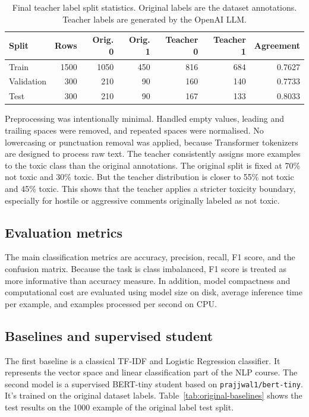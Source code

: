 \documentclass[pdflatex,sn-mathphys-num]{sn-jnl}
\begin{document}
\begin{table}[h]
\caption{Final teacher label split statistics.
Original labels are the dataset annotations.
Teacher labels are generated by the OpenAI LLM.}\label{tab:teacher-splits}
\centering
\begin{tabular}{lrrrrrr}
\toprule
Split & Rows & Orig. 0 & Orig. 1 & Teacher 0 & Teacher 1 & Agreement \\
\midrule
Train & 1500 & 1050 & 450 & 816 & 684 & 0.7627 \\
Validation & 300 & 210 & 90 & 160 & 140 & 0.7733 \\
Test & 300 & 210 & 90 & 167 & 133 & 0.8033 \\
\bottomrule
\end{tabular}
\end{table}

Preprocessing was intentionally minimal.
Handled empty values, leading and trailing spaces were removed, and repeated spaces were normalised. 
No lowercasing or punctuation removal was applied, because Transformer tokenizers are designed to process raw text.
The teacher consistently assigns more examples to the toxic class than the original annotations. 
The original split is fixed at 70\% not toxic and 30\% toxic.
But the teacher distribution is closer to 55\% not toxic and 45\% toxic. 
This shows that the teacher applies a stricter toxicity boundary, especially for hostile or aggressive comments originally labeled as not toxic.

\subsection{Evaluation metrics}

The main classification metrics are accuracy, precision, recall, F1 score, and the confusion matrix. 
Because the task is class imbalanced, F1 score is treated as more informative than accuracy measure.
In addition, model compactness and computational cost are evaluated using model size on disk, average inference time per example, and examples processed per second on CPU.

\subsection{Baselines and supervised student}

The first baseline is a classical TF-IDF and Logistic Regression classifier.
It represents the vector space and linear classification part of the NLP course.
The second model is a supervised BERT-tiny student based on \texttt{prajjwal1/bert-tiny}.
It's trained on the original dataset labels.
Table~\ref{tab:original-baselines} shows the test results on the 1000 example of the original label test split.
\end{document}
